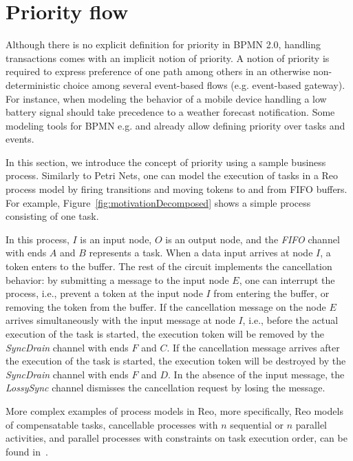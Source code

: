 \section{Priority flow}
\label{sec:example}
Although there is no explicit definition for priority in BPMN 2.0, handling transactions comes with an implicit notion of priority. A notion of priority is required to  express preference of one path among others in an otherwise non-deterministic choice among several event-based flows (e.g. event-based gateway). For instance, when modeling the behavior of a mobile device handling a low battery signal should take precedence to a weather forecast notification. 
Some modeling tools for BPMN e.g. \cite{bpmntoolprio} and \cite{bizagi} already allow defining priority over tasks and events. 

In this section, we introduce the concept of priority using a sample business process. Similarly to Petri Nets, one can model the execution of tasks in a Reo process model by firing transitions and moving tokens to and from FIFO buffers. For example, Figure~\ref{fig:motivationDecomposed} shows a simple process consisting of one task.

In this process,  $I$ is an input node, $O$ is an output node, and the \emph{FIFO} channel with ends $A$ and $B$ represents a task. When a data input arrives at node $I$, a token enters to the buffer.
The rest of the circuit implements the cancellation behavior: by submitting a message to the input node $E$, one can interrupt the process, i.e., prevent a token at the input node $I$ from entering the buffer, or removing the token from the buffer. If the cancellation message on the node $E$ arrives simultaneously with the input message at node $I$, i.e., before the actual execution of the task is started, the execution token will be removed by the \emph{SyncDrain} channel with ends $F$ and $C$. If the cancellation message arrives after the execution of the task is started, the execution token will be destroyed by the \emph{SyncDrain} channel with ends $F$ and $D$. In the absence of the input message, the \emph{LossySync} channel dismisses the cancellation request by losing the message.

More complex examples of process models in Reo, more specifically, Reo models of compensatable tasks, cancellable processes with $n$ sequential or $n$ parallel activities, and parallel processes with constraints on task execution order, can be found in~\cite{natallialong}.

